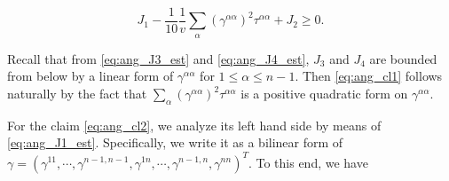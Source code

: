 \documentclass[12pt]{article}
\numberwithin{equation}{section}
\theoremstyle{plain}
\theoremstyle{definition}
\theoremstyle{remark}
\begin{document}
     \begin{equation} \label{eq:ang_cl2}
    J_1 - \frac{1}{10} \frac{1}{v}  \sum_{\alpha} (\gamma^{\alpha \alpha})^2 \tau^{\alpha \alpha} +J_2 \geq 0.
   \end{equation}
   
Recall that from \eqref{eq:ang_J3_est} and \eqref{eq:ang_J4_est}, $J_3$ and $J_4$ are bounded 
from below by a linear form of $\gamma^{\alpha \alpha}$ for $1\leq \alpha \leq n-1$. Then \eqref{eq:ang_cl1} follows naturally by the fact that $\sum_{\alpha} (\gamma^{\alpha \alpha})^2 \tau^{\alpha \alpha}$ is a positive quadratic form on $\gamma^{\alpha \alpha}$.

For the claim \eqref{eq:ang_cl2}, we analyze its left hand side by 
means of \eqref{eq:ang_J1_est}. Specifically, we write it as a bilinear form  of
$\gamma = (\gamma^{11}, \cdots, \gamma^{n-1,n-1}, \gamma^{1n}, \cdots, \gamma^{n-1,n}, \gamma^{nn}  )^T$. To this end, we have
\end{document}
